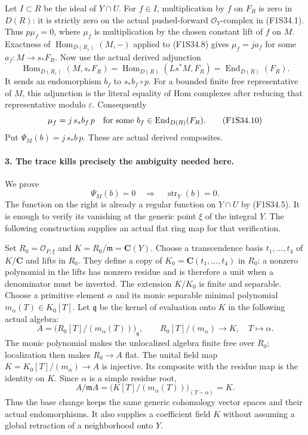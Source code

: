 Let $I\subset R$ be the ideal of $Y\cap U$.
For $f\in I$, multiplication by $f$ on $F_R$
is zero in $D(R)$: it is strictly zero on the
actual pushed-forward $\mathcal O_Y$-complex
in (F1S34.1).
Thus $p\mu_f=0$, where $\mu_f$ is multiplication
by the chosen constant lift of $f$ on $M$.
Exactness of $\operatorname{Hom}_{D(R_\varepsilon)}
(M,-)$ applied to (F1S34.8) gives
$\mu_f=j a_f$ for some $a_f:M\to s_*F_R$.
Now use the actual derived adjunction
\[
 \operatorname{Hom}_{D(R_\varepsilon)}(M,s_*F_R)
      =\operatorname{Hom}_{D(R)}(Ls^*M,F_R)
      =\operatorname{End}_{D(R)}(F_R).
 \tag{F1S34.9}
\]
It sends an endomorphism $b_f$ to $s_*b_f\circ p$.
For a bounded finite free representative of $M$,
this adjunction is the literal equality of
Hom complexes after reducing that representative
modulo $\varepsilon$.
Consequently
\[
       \mu_f=j\,s_*b_f\,p
       \quad\hbox{for some }
                b_f\in\operatorname{End}_{D(R)}(F_R).
 \tag{F1S34.10}
\]
Put $\Psi_M(b)=j\,s_*b\,p$. These are actual
derived composites.

\paragraph{3. The trace kills precisely the ambiguity needed here.}
We prove
\[
       \Psi_M(b)=0
              \quad\Longrightarrow\quad
                      \operatorname{str}_Y(b)=0.
 \tag{F1S34.11}
\]
The function on the right is already a regular
function on $Y\cap U$ by (F1S34.5).
It is enough to verify its vanishing at the
generic point $\xi$ of the integral $Y$.
The following construction supplies an actual
flat ring map for that verification.

Set $R_0=\mathcal O_{P,\xi}$ and
$K=R_0/\mathfrak m=\mathbf C(Y)$.
Choose a transcendence basis
$t_1,\ldots,t_4$ of $K/\mathbf C$ and lifts in
$R_0$. They define a copy of
$K_0=\mathbf C(t_1,\ldots,t_4)$ in $R_0$:
a nonzero polynomial in the lifts has nonzero
residue and is therefore a unit when a
denominator must be inverted.
The extension $K/K_0$ is finite and separable.
Choose a primitive element $\alpha$ and its
monic separable minimal polynomial
$m_\alpha(T)\in K_0[T]$.
Let $\mathfrak q$ be the kernel of evaluation
onto $K$ in the following actual algebra:
\[
 A=\bigl(R_0[T]/(m_\alpha(T))\bigr)_{\mathfrak q},
 \qquad R_0[T]/(m_\alpha)\longrightarrow K,\quad
                         T\longmapsto\alpha.
 \tag{F1S34.12}
\]
The monic polynomial makes the unlocalized
algebra finite free over $R_0$; localization
then makes $R_0\to A$ flat.
The unital field map
$K=K_0[T]/(m_\alpha)\to A$ is injective.
Its composite with the residue map is the
identity on $K$.
Since $\alpha$ is a simple residue root,
\[
 A/\mathfrak m A
    =\bigl(K[T]/(m_\alpha(T))\bigr)_{(T-\alpha)}
    =K.
 \tag{F1S34.13}
\]
Thus the base change keeps the same generic
cohomology vector spaces and their actual
endomorphisms. It also supplies a coefficient
field $K$ without assuming a global retraction
of a neighborhood onto $Y$.

